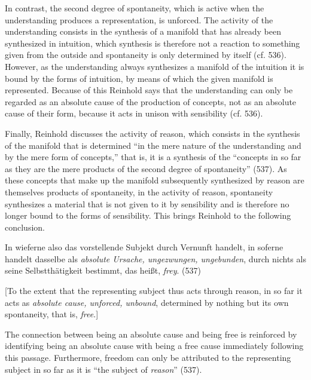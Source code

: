  In contrast, the second degree of spontaneity, which is active when the understanding produces a representation, is unforced. The activity of the understanding consists in the synthesis of a manifold that has already been synthesized in intuition, which synthesis is therefore not a reaction to something given from the outside and spontaneity is only determined by itself (cf. 536). However, as the understanding always synthesizes a manifold of the intuition it is bound by the forms of intuition, by means of which the given manifold is represented. Because of this Reinhold says that the understanding can only be regarded as an absolute cause of the production of concepts, not as an absolute cause of their form, because it acts in unison with sensibility (cf. 536).

 Finally, Reinhold discusses the activity of reason, which consists in the synthesis of the manifold that is determined ``in the mere nature of the understanding and by the mere form of concepts,'' that is, it is a synthesis of the ``concepts in so far as they are the mere products of the second degree of spontaneity'' (537). As these concepts that make up the manifold subsequently synthesized by reason are themselves products of spontaneity, in the activity of reason, spontaneity synthesizes a material that is not given to it by sensibility and is therefore no longer bound to the forms of sensibility. This brings Reinhold to the following conclusion. 

In wieferne also das vorstellende Subjekt durch Vernunft handelt, in soferne handelt dasselbe als \textit{absolute Ursache, ungezwungen, ungebunden}, durch nichts als seine Selbstth\"{a}tigkeit bestimmt, das hei\ss{}t, \textit{frey}. (537)

[To the extent that the representing subject thus acts through reason, in so far it acts as \textit{absolute cause, unforced, unbound}, determined by nothing but its own spontaneity, that is, \textit{free}.]

The connection between being an absolute cause and being free is reinforced by identifying being an absolute cause with being a free cause immediately following this passage. Furthermore, freedom can only be attributed to the representing subject in so far as it is ``the subject of \textit{reason}'' (537). 

